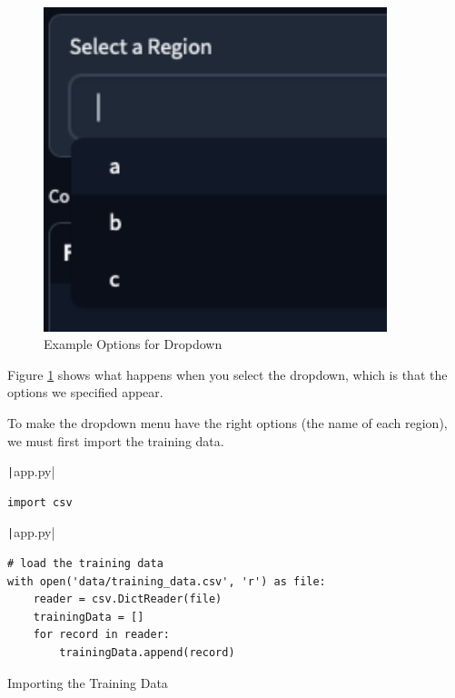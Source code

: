 \documentclass[12pt]{report}
\newcommand{\pil}[1]{\protect\texttt|#1|}
\begin{document}
\begin{figure}[H]
\centering
\includegraphics[width=10cm]{ss17.2.png}
\caption{Example Options for Dropdown}\label{fig:ss17.2}
\end{figure}

Figure \ref{fig:ss17.2} shows what happens when you select the dropdown, which is that the options we specified appear.

\begin{center}
\end{center}

To make the dropdown menu have the right options (the name of each region), we must first import the training data.

\begin{listing}[H]
\pil{app.py}
\begin{verbatim}
import csv
\end{verbatim}
\pil{app.py}
\begin{verbatim}
# load the training data
with open('data/training_data.csv', 'r') as file:
    reader = csv.DictReader(file)
    trainingData = []
    for record in reader:
        trainingData.append(record)
\end{verbatim}
\caption{Importing the Training Data}\label{cs:importTrainingData}
\end{listing}
\end{document}
